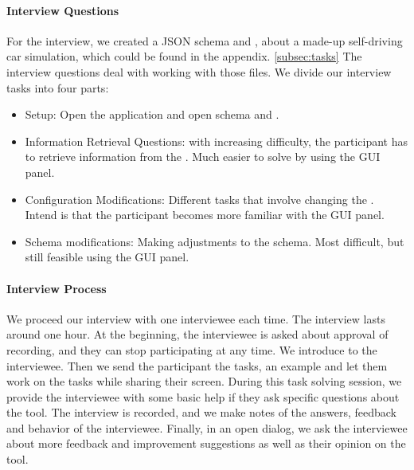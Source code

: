 \paragraph{Interview Questions}
For the interview, we created a JSON schema and \cfgfile{}, about a made-up self-driving car simulation, which could be found in the appendix. \ref{subsec:tasks}
The interview questions deal with working with those files.
We divide our interview tasks into four parts:
\begin{itemize}
    \item Setup: Open the application and open schema and \cfgfile.
    \item Information Retrieval Questions: with increasing difficulty, the participant has to retrieve information from the \cfgfile{}.
    Much easier to solve by using the GUI panel.
    \item Configuration Modifications: Different tasks that involve changing the \cfgfile{}.
    Intend is that the participant becomes more familiar with the GUI panel.
    \item Schema modifications: Making adjustments to the schema.
    Most difficult, but still feasible using the GUI panel.
\end{itemize}


\paragraph{Interview Process}
We proceed our interview with one interviewee each time.
The interview lasts around one hour.
At the beginning, the interviewee is asked about approval of recording, and they can stop participating at any time.
We introduce \toolname{} to the interviewee.
Then we send the participant the tasks, an example \cfgfile{} and let them work on the tasks while sharing their screen.
During this task solving session, we provide the interviewee with some basic help if they ask specific questions about the tool.
The interview is recorded, and we make notes of the answers, feedback and behavior of the interviewee.
Finally, in an open dialog, we ask the interviewee about more feedback and improvement suggestions as well as their opinion on the tool.


